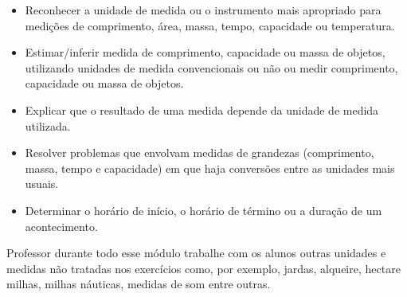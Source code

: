 \begin{itemize}
    \item Reconhecer a unidade de medida ou o instrumento mais apropriado para
medições de comprimento, área, massa, tempo, capacidade ou temperatura.

    \item Estimar/inferir medida de comprimento, capacidade ou massa de objetos,
utilizando unidades de medida convencionais ou não ou medir comprimento,
capacidade ou massa de objetos.

    \item Explicar que o resultado de uma medida depende da unidade de medida
utilizada.

    \item Resolver problemas que envolvam medidas de grandezas (comprimento,
massa, tempo e capacidade) em que haja conversões entre as unidades mais
usuais.

    \item Determinar o horário de início, o horário de término ou a duração de
um acontecimento.
\end{itemize}

Professor durante todo esse módulo trabalhe com os alunos outras
unidades e medidas não tratadas nos exercícios como, por exemplo,
jardas, alqueire, hectare milhas, milhas náuticas, medidas de som entre
outras.


